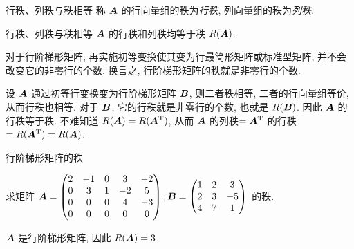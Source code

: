 \begin{frame}{行秩、列秩与秩相等}
	\onslide<+->
	称 ${\boldsymbol{A}}$ 的行向量组的秩为\emph{行秩}, 列向量组的秩为\emph{列秩}.
	\onslide<+->
	\begin{second}{行秩、列秩与秩相等}
		${\boldsymbol{A}}$ 的行秩和列秩均等于秩 $R({\boldsymbol{A}})$.
	\end{second}
	\onslide<+->
	对于行阶梯形矩阵, 再实施初等变换使其变为行最简形矩阵或标准型矩阵, 并不会改变它的非零行的个数.
	\onslide<+->
	换言之, \alert{行阶梯形矩阵的秩就是非零行的个数}.

	\onslide<+->
	设 ${\boldsymbol{A}}$ 通过初等行变换变为行阶梯形矩阵 ${\boldsymbol{B}}$, 则二者秩相等, 二者的行向量组等价, 从而行秩也相等.
	\onslide<+->
	对于 ${\boldsymbol{B}}$, 它的行秩就是非零行的个数, 也就是 $R({\boldsymbol{B}})$.
	\onslide<+->
	因此 ${\boldsymbol{A}}$ 的行秩等于秩.
	\onslide<+->
	不难知道 $R({\boldsymbol{A}})=R({\boldsymbol{A}}^{\mathrm{T}})$,
	从而 ${\boldsymbol{A}}$ 的列秩$={\boldsymbol{A}}^{\mathrm{T}}$ 的行秩$=R({\boldsymbol{A}}^{\mathrm{T}})=R({\boldsymbol{A}})$.
\end{frame}


\begin{frame}{行阶梯形矩阵的秩}

	\onslide<+->
	\begin{example}
		求矩阵 ${\boldsymbol{A}}=\begin{pmatrix}
			2&-1&0&3&-2\\
			0&3&1&-2&5\\
			0&0&0&4&-3\\
			0&0&0&0&0
		\end{pmatrix},{\boldsymbol{B}}=\begin{pmatrix}
			1&2&3\\
			2&3&-5\\
			4&7&1
		\end{pmatrix}$ 的秩.
	\end{example}
	\onslide<+->
	\begin{solution}
		${\boldsymbol{A}}$ 是行阶梯形矩阵, 因此 $R({\boldsymbol{A}})=3$.
		\onslide<+->{\[\bfB\wsim{r_2-2r_1}{r_4-4r_1}\begin{pmatrix}
			1&2&3\\
			0&-1&-11\\
			0&-1&-11
		\end{pmatrix}\wsim{r_3-r_2}{-r_2}\begin{pmatrix}
			1&2&3\\
			0&1&11\\
			0&0&0
		\end{pmatrix}\visible<+->{\implies R(\bfB)=2.}\]}
		\vspace{-\baselineskip}
	\end{solution}
\end{frame}


